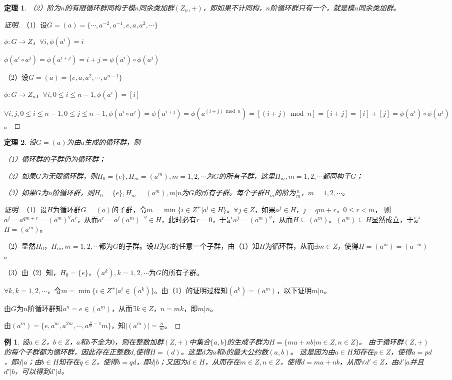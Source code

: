 \documentclass{article}
\newtheorem{Thm}{定理}
\newtheorem*{Example}{例}
\begin{document}
\begin{CJK*}{UTF8}{gbsn}
\begin{Thm}
  （2）阶为$n$的有限循环群同构于模$n$同余类加群$(Z_n,+)$，即如果不计同构，$n$阶循环群只有一个，就是模$n$同余类加群。
\end{Thm}
\begin{proof}[证明]
  （1）设$G=(a)=\{\cdots,a^{-2},a^{-1},e,a,a^2,\cdots\}$

  $\phi:G\to Z$，$\forall i, \phi(a^i)=i$

  $\phi(a^i\circ a^j)=\phi(a^{i+j})=i+j=\phi(a^i)\circ\phi(a^j)$

  （2）设$G=(a)=\{e,a,a^2,\cdots,a^{n-1}\}$

  $\phi:G\to Z_n$，$\forall i, 0\leq i\leq n-1,\phi(a^i)=[i]$

  $\forall i,j, 0\leq i\leq n-1,0\leq j\leq n-1,\phi(a^i\circ a^j)=\phi(a^{i+j})=\phi(a^{(i+j)\bmod n})=[(i+j)\bmod n]=[i+j]=[i]+[j]=\phi(a^i)\circ \phi(a^j)$。

\end{proof}
\begin{Thm}
  设$G=(a)$为由$a$生成的循环群，则

  （1）循环群的子群仍为循环群；

  （2）如果$G$为无限循环群，则$H_0=\{e\},H_m=(a^m),m=1,2,\cdots$为$G$的所有子群，这里$H_m,m=1,2,\cdots$都同构于$G$；

  （3）如果$G$为$n$阶循环群，则$H_0=\{e\},H_m=(a^m),m|n$为$G$的所有子群。每个子群$H_m$的阶为$\frac{n}{m}$，$m=1,2,\cdots$。
\end{Thm}
\begin{proof}[证明]
  （1）设$H$为循环群$G=(a)$的子群，令$m=\min \{i\in Z^+|a^i\in H\}$。$\forall j\in Z$，如果$a^j\in H$，$j=qm+r$，$0\leq r < m$，
  则$a^j=a^{qm+r}=(a^m)^qa^r$，从而$a^r=a^j(a^{m})^{-q}\in H$，此时必有$r=0$，于是$a^j=(a^m)^q$，从而$H\subseteq (a^m)$。$(a^m)\subseteq H$显然成立，于是$H=(a^m)$。

  （2）显然$H_0$，$H_m,m=1,2,\cdots$都为$G$的子群。设$H$为$G$的任意一个子群，由（1）知$H$为循环群，从而$\exists m\in Z$，使得$H=(a^m)=(a^{-m})$。

  （3）由（2）知，$H_0=\{e\}$，$(a^k),k=1,2,\cdots$为$G$的所有子群。

  $\forall k,k=1,2,\cdots$，令$m=\min \{i\in Z^+|a^i\in (a^k)\}$。由（1）的证明过程知$(a^k)=(a^m)$，以下证明$m|n$。

  由$G$为$n$阶循环群知$a^n=e\in (a^m)$，从而$\exists k\in Z$，$n=mk$，即$m|n$。

  由$(a^m)=\{e,a^m,a^{2m},\cdots,a^{\frac{n}{m}-1}m\}$，知$|(a^m)|=\frac{n}{m}$。
\end{proof}
\begin{Example}
  设$a\in Z$，$b\in Z$，$a$和$b$不全为$0$，则在整数加群$(Z,+)$中集合$\{a,b\}$的生成子群为$H=\{ma+nb|m\in Z,n\in Z\}$。
  由于循环群$(Z,+)$的每个子群都为循环群，因此存在正整数$d$,使得$H=(d)$。这里$d$为$a$和$b$的最大公约数$(a,b)$。
  这是因为由$a\in H$知存在$p\in Z$，使得$a=pd$，即$d|a$；由$b\in H$知存在$q\in Z$，使得$b=qd$，即$d|b$；又因为$d\in H$，从而存在$m\in Z,n\in Z$，使得$d=ma+nb$，从而$\forall d'\in Z$，由$d'|a$并且$d'|b$，可以得到$d'|d$。
\end{Example}


\end{CJK*}
\end{document}
